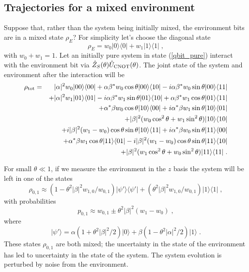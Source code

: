 \documentclass[12pt]{article}
\def\bra#1{{\langle #1 |}}
\def\ket#1{{| #1 \rangle}}
\def\U{{\hat U}}
\def\Z{{\hat Z}}
\begin{document}
\subsection{Trajectories for a mixed environment}

Suppose that, rather than the system being initially mixed, the environment
bits are in a mixed state $\rho_E$?  For simplicity let's choose
the diagonal state
\begin{equation}
\rho_E = w_0 \ket0\bra0 + w_1 \ket1\bra1 \;,
\end{equation}
with $w_0+w_1=1$.  Let an initially pure system in state (\ref{qbit_pure})
interact with the environment bit via
$\Z_S(\theta)\U_{\rm CNOT}(\theta)$.  The joint
state of the system and environment after the interaction will be
\begin{eqnarray}
\rho_{\rm tot} &=& |\alpha|^2 w_0 \ket{00}\bra{00} +
 \alpha\beta^* w_0 \cos\theta \ket{00}\bra{10} -
 i \alpha\beta^* w_0 \sin\theta \ket{00}\bra{11} \nonumber\\
&& + |\alpha|^2 w_1 \ket{01}\bra{01} -
 i \alpha\beta^* w_1 \sin\theta \ket{01}\bra{10} +
 \alpha\beta^* w_1 \cos\theta \ket{01}\bra{11} \nonumber\\
&& + \alpha^*\beta w_0 \cos\theta \ket{10}\bra{00} +
 i \alpha^*\beta w_1 \sin\theta \ket{10}\bra{01} \nonumber\\
&& + |\beta|^2(w_0 \cos^2\theta + w_1\sin^2\theta) \ket{10}\bra{10} \nonumber\\
&& + i |\beta|^2(w_1 - w_0) \cos\theta\sin\theta \ket{10}\bra{11} +
 i \alpha^*\beta w_0 \sin\theta \ket{11}\bra{00} \nonumber\\
&& + \alpha^*\beta w_1 \cos\theta \ket{11}\bra{01}
 - i |\beta|^2(w_1 - w_0) \cos\theta\sin\theta \ket{11}\bra{10} \nonumber\\
&& + |\beta|^2(w_1 \cos^2\theta + w_0\sin^2\theta) \ket{11}\bra{11} \;.
\end{eqnarray}

For small $\theta\ll1$, if we measure the environment in the $z$ basis
the system will be left in one of the states
\begin{equation}
\rho_{0,1} \approx
  (1-\theta^2|\beta|^2 w_{1,0}/w_{0,1}) \ket{\psi'}\bra{\psi'}
  + (\theta^2|\beta|^2 w_{1,0}/w_{0,1}) \ket1\bra1 \;,
\end{equation}
with probabilities
\begin{equation}
p_{0,1} \approx w_{0,1} \pm \theta^2|\beta|^2(w_1 - w_0) \;,
\label{mixed_probs}
\end{equation}
where
\begin{equation}
\ket{\psi'} = \alpha(1 + \theta^2|\beta|^2/2) \ket0 + 
 \beta(1 - \theta^2|\alpha|^2/2) \ket1 \;.
\end{equation}
These states $\rho_{0,1}$ are both mixed; the uncertainty in the
state of the environment has led to uncertainty in the state of the
system.  The system evolution is perturbed by noise from the
environment.
\end{document}
